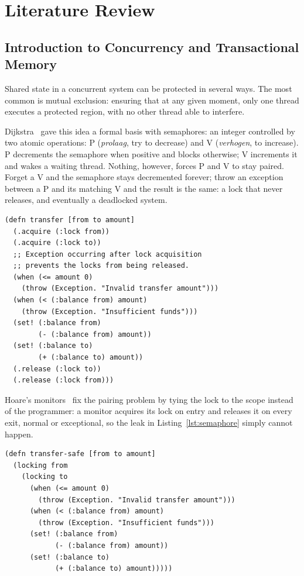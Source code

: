 \chapter{Literature Review}

\section{Introduction to Concurrency and Transactional Memory}

Shared state in a concurrent system can be protected in several ways. The
most common is mutual exclusion: ensuring that at any given moment, only one
thread executes a protected region, with no other thread able to interfere.

Dijkstra~\cite{dijkstra1968} gave this idea a formal basis with semaphores: an
integer controlled by two atomic operations: P (\emph{prolaag},
try to decrease) and V (\emph{verhogen}, to increase). P decrements the semaphore when
positive and blocks otherwise; V increments it and wakes a waiting thread.
Nothing, however, forces P and V to stay paired. Forget a V and the semaphore
stays decremented forever; throw an exception between a P and its matching V
and the result is the same: a lock that never releases, and eventually a
deadlocked system.

\begin{listing}[ht]
  \begin{verbatim}
(defn transfer [from to amount]
  (.acquire (:lock from))
  (.acquire (:lock to))
  ;; Exception occurring after lock acquisition
  ;; prevents the locks from being released.
  (when (<= amount 0)
    (throw (Exception. "Invalid transfer amount")))
  (when (< (:balance from) amount)
    (throw (Exception. "Insufficient funds")))
  (set! (:balance from) 
        (- (:balance from) amount))
  (set! (:balance to)   
        (+ (:balance to) amount))
  (.release (:lock to))
  (.release (:lock from)))
\end{verbatim}
  \caption{Explicit lock-based synchronization vulnerable to lock leakage under exceptions.}
  \label{lst:semaphore}
\end{listing}

Hoare's monitors~\cite{hoare1974} fix the pairing problem by tying the lock
to the scope instead of the programmer: a monitor acquires its lock on entry
and releases it on every exit, normal or exceptional, so the leak in
Listing~\ref{lst:semaphore} simply cannot happen.

\begin{listing}[ht]
  \begin{verbatim}
(defn transfer-safe [from to amount]
  (locking from
    (locking to
      (when (<= amount 0)
        (throw (Exception. "Invalid transfer amount")))
      (when (< (:balance from) amount)
        (throw (Exception. "Insufficient funds")))
      (set! (:balance from) 
            (- (:balance from) amount))
      (set! (:balance to)   
            (+ (:balance to) amount)))))
\end{verbatim}
  \caption{Monitor-style synchronization with automatic lock release.}
  \label{lst:monitor}
\end{listing}

